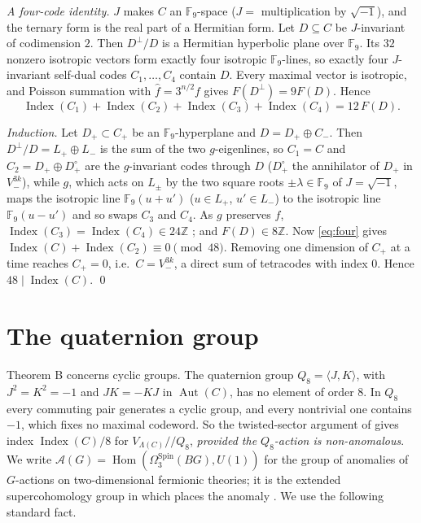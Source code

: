 \documentclass[11pt]{amsart}
\theoremstyle{definition}
\newcommand{\Fn}{\mathbb{F}_9}
\newcommand{\Index}{\operatorname{Index}}
\newcommand{\Aut}{\operatorname{Aut}}
\begin{document}
\emph{A four-code identity.} $J$ makes $C$ an $\Fn$-space ($J=$ multiplication by
$\sqrt{-1}$), and the ternary form is the real part of a Hermitian form. Let $D\subseteq C$ be
$J$-invariant of codimension $2$. Then $D^\perp/D$ is a Hermitian hyperbolic plane over $\Fn$. Its
$32$ nonzero isotropic vectors form exactly four isotropic $\Fn$-lines, so exactly four
$J$-invariant self-dual codes $C_1,\dots,C_4$ contain $D$. Every maximal vector is isotropic, and
Poisson summation with $\hat f=3^{n/2}f$ gives $F(D^\perp)=9F(D)$. Hence
\begin{equation}\label{eq:four}
\Index(C_1)+\Index(C_2)+\Index(C_3)+\Index(C_4)=12\,F(D).
\end{equation}

\emph{Induction.} Let $D_+\subset C_+$ be an $\Fn$-hyperplane and $D=D_+\oplus C_-$. Then
$D^\perp/D=L_+\oplus L_-$ is the sum of the two $g$-eigenlines, so $C_1=C$ and
$C_2=D_+\oplus D_+^{\circ}$ are the $g$-invariant codes through $D$ ($D_+^\circ$ the annihilator of
$D_+$ in $V_-^{3k}$), while $g$, which acts on $L_\pm$ by the
two square roots $\pm\lambda\in\Fn$ of $J=\sqrt{-1}$, maps the isotropic line $\Fn(u+u')$
($u\in L_+$, $u'\in L_-$) to the isotropic line $\Fn(u-u')$ and so swaps $C_3$ and $C_4$. As $g$
preserves $f$, $\Index(C_3)=\Index(C_4)\in24\mathbb Z$ \cite{GJF,BR}; and $F(D)\in8\mathbb Z$.
Now \eqref{eq:four} gives $\Index(C)+\Index(C_2)\equiv0\pmod{48}$. Removing one dimension of $C_+$
at a time reaches $C_+=0$, i.e.\ $C=V_-^{3k}$, a direct sum of tetracodes with index $0$. Hence
$48\mid\Index(C)$. \qed

\section{The quaternion group}\label{sec:q8}

Theorem B concerns cyclic groups. The quaternion group $Q_8=\langle J,K\rangle$, with
$J^2=K^2=-1$ and $JK=-KJ$ in $\Aut(C)$, has no element of order $8$. In $Q_8$ every commuting pair
generates a cyclic group, and every nontrivial one contains $-1$, which fixes no maximal codeword.
So the twisted-sector argument of \cite{GJF} gives index $\Index(C)/8$ for
$V_{\Lambda(C)}/\!\!/Q_8$, \emph{provided the $Q_8$-action is non-anomalous}. We write
$\mathcal A(G)=\operatorname{Hom}(\Omega_3^{\mathrm{Spin}}(BG),U(1))$ for the group of anomalies
of $G$-actions on two-dimensional fermionic theories; it is the extended supercohomology group in which
\cite[Thm.~4.2]{GJF} places the anomaly \cite[\S2.4]{JF}. We use the following standard fact.
\end{document}
